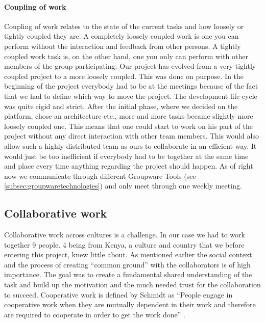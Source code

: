 \paragraph{Coupling of work} \label{par:couplingofwork}
Coupling of work relates to the state of the current tasks and how loosely or tightly coupled they are. A completely loosely coupled work is one you can perform without the interaction and feedback from other persons. A tightly coupled work task is, on the other hand, one you only can perform with other members of the group participating. Our project has evolved from a very tightly coupled project to a more loosely coupled. This was done on purpose. In the beginning of the project everybody had to be at the meetings because of the fact that we had to define which way to move the project. The development life cycle was quite rigid and strict. After the initial phase, where we decided on the platform, chose an architecture etc., more and more tasks became slightly more loosely coupled one. This means that one could start to work on his part of the project without any direct interaction with other team members. This would also allow such a highly distributed team as ours to collaborate in an efficient way. It would just be too inefficient if everybody had to be together at the same time and place every time anything regarding the project should happen. As of right now we communicate through different Groupware Tools (see \ref{subsec:groupwaretechnologies}) and only meet through one weekly meeting.

\subsection{Collaborative work} \label{sub:collaborativework}
Collaborative work across cultures is a challenge. In our case we had to work together 9 people. 4 being from Kenya, a culture and country that we before entering this project, knew little about. As mentioned earlier the social context and the process of creating ``common ground'' with the collaborators is of high importance. The goal was to create a fundamental shared understanding of the task and build up the motivation and the much needed trust for the collaboration to succeed. Cooperative work is defined by Schmidt as ``People engage in cooperative work when they are mutually dependent in their work and therefore are required to cooperate in order to get the work done'' \cite{schmidt1992taking}.

